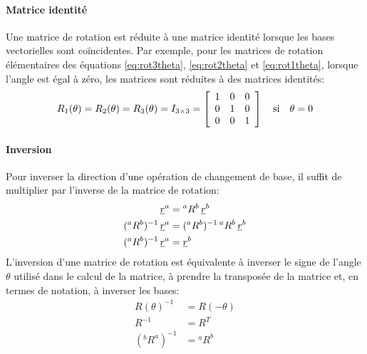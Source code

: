 \paragraph{Matrice identité}
Une matrice de rotation est réduite à une matrice identité lorsque les bases vectorielles sont coïncidentes. Par exemple, pour les matrices de rotation élémentaires des équations \eqref{eq:rot3theta}, \eqref{eq:rot2theta} et \eqref{eq:rot1theta}, lorsque l'angle est égal à zéro, les matrices sont réduites à des matrices identités:
\begin{align}
	R_1( \theta ) = R_2( \theta ) = R_3( \theta ) = I_{3\times3} =
	\left[ \begin{array}{c c c}
			   1 & 0 & 0 \\
			   0 & 1 & 0 \\
			   0 & 0 & 1
	\end{array}  \right]  \quad\text{si}\quad \theta = 0
	\label{eq:rot3thetaident}
\end{align}

\paragraph{Inversion}

Pour inverser la direction d'une opération de changement de base, il suffit de multiplier par l'inverse de la matrice de rotation:
\begin{align}
	\underline{r}^a &= {}^aR^b \, \underline{r}^b \\
	({}^aR^b)^{-1} \, \underline{r}^a &= ({}^aR^b)^{-1} \, {}^aR^b \, \underline{r}^b  \\
	({}^aR^b)^{-1} \, \underline{r}^a &= \underline{r}^b
\end{align}
L'inversion d'une matrice de rotation est équivalente à inverser le signe de l'angle $\theta$ utilisé dans le calcul de la matrice, à prendre la transposée de la matrice et, en termes de notation, à inverser les bases:
\begin{align}
	R(\theta)^{-1} &= R(-\theta) \\
	R^{-1} &= R^T \\
	({}^bR^a)^{-1} &= {}^aR^b
\end{align}


